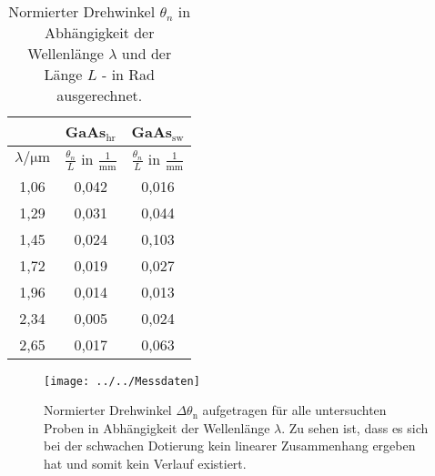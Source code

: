 
\begin{table}[htpb]
	\centering
	\caption{Normierter Drehwinkel $\theta_n$ in Abhängigkeit der Wellenlänge $\lambda$ und der Länge $L$ - in Rad ausgerechnet.}
	\label{tab:messwerte4}
	\begin{tabular}{ccc}
		\toprule
		& GaAs$_\text{hr}$ & GaAs$_\text{sw}$ \\
		\midrule
		$\lambda / \si{\micro\meter}$ & $\frac{\theta_n}{L}$ in $\frac{1}{\si{\milli\meter}}$ & $\frac{\theta_n}{L}$ in $\frac{1}{\si{\milli\meter}}$ \\
		\midrule
		1,06 	& 0,042	& 0,016 \\
		1,29	& 0,031	& 0,044 \\
		1,45	& 0,024	& 0,103 \\
		1,72	& 0,019	& 0,027 \\
		1,96	& 0,014	& 0,013 \\
		2,34	& 0,005	& 0,024 \\
		2,65	& 0,017 & 0,063	\\
		\bottomrule
	\end{tabular}
\end{table}

\begin{figure}[h!]
	\centering
	\texttt{[image: ../../Messdaten]}
	\caption{Normierter Drehwinkel $\Delta\theta_\text{n}$ aufgetragen für alle untersuchten Proben in Abhängigkeit der Wellenlänge $\lambda$. Zu sehen ist, dass es sich bei der schwachen Dotierung kein linearer Zusammenhang ergeben hat und somit kein Verlauf existiert.}
	\label{fig:messdaten}
\end{figure}

